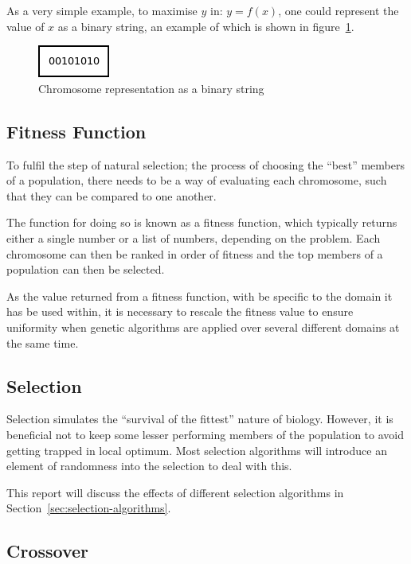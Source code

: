 \documentclass[10pt, a4paper]{article}
\begin{document}
As a very simple example, to maximise $y$ in: $y = f(x)$, one could represent 
the value of $x$ as a binary string, an example of which is shown in 
figure~\ref{fig:chromosome}.

\begin{figure}[h]
\centering
\includegraphics[scale=0.6]{img/chromosome.png}
\caption{Chromosome representation as a binary string}\label{fig:chromosome}
\end{figure}

\subsection{Fitness Function}
To fulfil the step of natural selection; the process of choosing the ``best''
members of a population, there needs to be a way of evaluating each chromosome,
such that they can be compared to one another.

The function for doing so is known as a fitness function, which typically 
returns either a single number or a list of numbers, depending on the problem.
Each chromosome can then be ranked in order of fitness and the top members of
a population can then be selected.

As the value returned from a fitness function, with be specific to the domain 
it has be used within, it is necessary to rescale the fitness value to ensure 
uniformity when genetic algorithms are applied over several different domains
at the same time. %


\subsection{Selection}
Selection simulates the ``survival of the fittest'' nature of biology. However,
it is beneficial not to keep some lesser performing members of the population
to avoid getting trapped in local optimum. Most selection algorithms will 
introduce an element of randomness into the selection to deal with this.

This report will discuss the effects of different selection algorithms in 
Section~\ref{sec:selection-algorithms}.

\subsection{Crossover}
\end{document}
